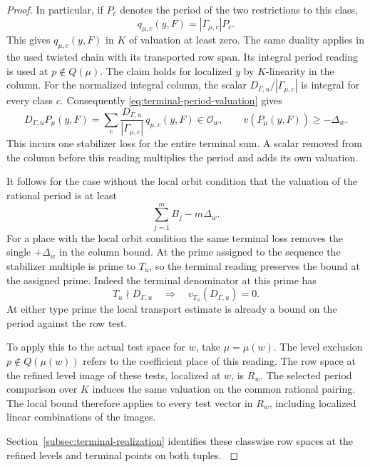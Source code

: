 \begin{proof}
In particular, if \(P_c\) denotes the period of the two restrictions to this class,
\[
  q_{\mu,c}(y,F)=|\Gamma_{\mu,c}|P_c .
\]
This gives \(q_{\mu,c}(y,F)\) in \(K\) of valuation
at least zero. The same duality applies in the used
twisted chain with its transported row span. Its
integral period reading is used at \(p\notin Q(\mu)\).
The claim holds for localized \(y\) by \(K\)-linearity in
the column. For the normalized integral column, the scalar
\(D_{\Gamma,u}/|\Gamma_{\mu,c}|\) is integral for every class \(c\).
Consequently \eqref{eq:terminal-period-valuation} gives
\[
 D_{\Gamma,u}P_\mu(y,F)
   =\sum_c \frac{D_{\Gamma,u}}{|\Gamma_{\mu,c}|}\,q_{\mu,c}(y,F)
        \in\mathcal O_w,\qquad v(P_\mu(y,F))\ge-\Delta_w .
\]
This incurs one stabilizer loss for the entire terminal sum. A scalar removed from the column before this
reading multiplies the period and adds its own valuation.

It follows for the case without the local orbit condition that the valuation of the
rational period is at least
\begin{equation}\label{eq:unserved-terminal-bound}
                   \sum_{j=1}^m B_j-m\Delta_w .
\end{equation}
For a place with the local orbit condition the same terminal loss removes the
single \(+\Delta_w\) in the column bound. At the prime assigned to the sequence the stabilizer multiple is prime to \(T_u\), so the
terminal reading preserves the bound at the assigned prime.
Indeed the terminal denominator at this prime has
\[
  T_u\nmid D_{\Gamma,u}\quad\Longrightarrow\quad v_{T_u}(D_{\Gamma,u})=0 .
\]
 At
either type prime the local transport estimate is
already a bound on the period against the row test.

To apply this to the actual test space for \(w\), take
\(\mu=\mu(w)\). The level exclusion \(p\notin Q(\mu(w))\)
refers to the coefficient place of this reading. The row space at the refined level image of these tests, localized at \(w\), is \(R_w\).
The selected period comparison over \(K\) induces the same
valuation on the common rational pairing. The local bound
therefore applies to every test vector in \(R_w\), including
localized linear combinations of the images.

Section~\ref{subsec:terminal-realization} identifies these
classwise row spaces at the refined levels and terminal points on both tuples.
\label{cor:terminal-period-1}
\end{proof}

